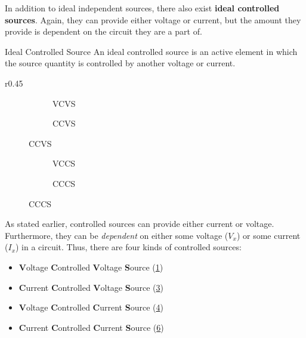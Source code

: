 \documentclass[12pt]{article}
\begin{document}
In addition to ideal independent sources, there also exist \textbf{ideal controlled sources}. Again, they can provide either voltage or current, but the amount they provide is dependent on the circuit they are a part of.

\begin{definition}{Ideal Controlled Source}
  An ideal controlled source is an active element in which the source quantity is controlled by another voltage or current.
\end{definition}

\begin{wrapfigure}[11]{r}{0.45\textwidth}
  \vspace{-10pt}
  \begin{subfigure}[H]{0.45\textwidth}
    \begin{subfigure}[H]{0.45\textwidth}
      
      \caption{VCVS}
      \label{fig:019}
    \end{subfigure}
    \begin{subfigure}[H]{0.45\textwidth}
      
      \caption{CCVS}
      \label{fig:020}
    \end{subfigure}
  \end{subfigure}
  \begin{subfigure}[H]{0.45\textwidth}
    \begin{subfigure}[H]{0.45\textwidth}
      
      \caption{VCCS}
      \label{fig:021}
    \end{subfigure}
    \begin{subfigure}[H]{0.45\textwidth}
      
      \caption{CCCS}
      \label{fig:022}
    \end{subfigure}
  \end{subfigure}
  \caption{Controlled Source Types}
  \label{fig:controlledSourceTypes}
\end{wrapfigure}

As stated earlier, controlled sources can provide either current or voltage. Furthermore, they can be \textit{dependent} on either some voltage ($V_x$) or some current ($I_x$) in a circuit. Thus, there are four kinds of controlled sources:

\begin{itemize}
  \itemsep0em
  \item \textbf{V}oltage \textbf{C}ontrolled \textbf{V}oltage \textbf{S}ource (\ref{fig:019})
  \item \textbf{C}urrent \textbf{C}ontrolled \textbf{V}oltage \textbf{S}ource (\ref{fig:020})
  \item \textbf{V}oltage \textbf{C}ontrolled \textbf{C}urrent \textbf{S}ource (\ref{fig:021})
  \item \textbf{C}urrent \textbf{C}ontrolled \textbf{C}urrent \textbf{S}ource (\ref{fig:022})
\end{itemize}
\end{document}
